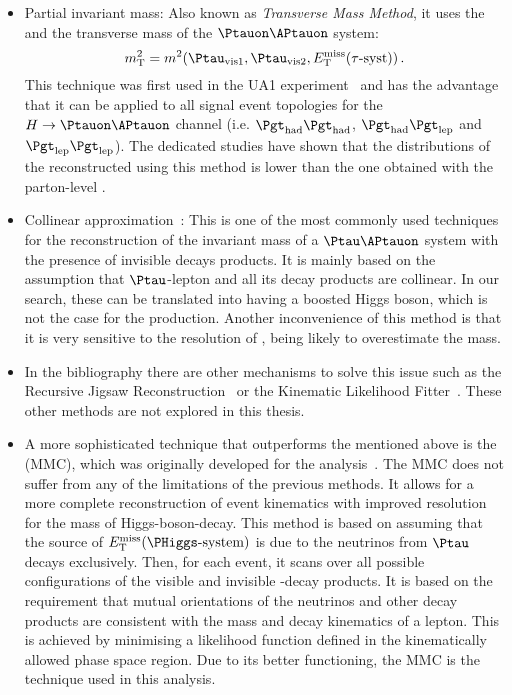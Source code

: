 \begin{itemize}
	\item Partial invariant mass: Also known as \textit{Transverse Mass Method}, it uses
		the \Hvismass and the transverse mass of the $\Ptauon\APtauon$ system:
		\begin{equation*}
			m_{\text{T}}^{2} = m^{2} (\Ptau_{\text{vis}1}, \Ptau_{\text{vis}2}, \MET(\tau\text{-syst}))\,.
		\end{equation*}
		This technique was first used in the UA1 experiment~\cite{Rubbia:155129} and has
		the advantage that it can be applied to all signal event topologies for the 
		$H \rightarrow \Ptauon \APtauon$ channel (i.e. $\tauhad \tauhad$, $\tauhad \taulep$ and $\taulep \taulep$). 
		The dedicated studies have shown that the distributions of the reconstructed \mH using this method is
		lower than the one obtained with the parton-level \mH.
		
	\item Collinear approximation~\cite{Ellis:1987xu}: This is one of the most commonly 
		used techniques for the reconstruction of the invariant mass of a $\Ptau\APtauon$ 
		system with the presence of invisible decays products.
		It is mainly based on the assumption that $\Ptau$-lepton and all its decay
		products are collinear. In our search, these can be translated into having a boosted
		Higgs boson, which is not the case for the \tHq production.
		Another inconvenience of this method is that it is very sensitive to the
		resolution of \MET, being likely to overestimate the mass. 
		
	\item In the bibliography there are other mechanisms to solve this issue such as the 
		Recursive Jigsaw Reconstruction~\cite{Jackson:2017gcy} or the 
		Kinematic Likelihood Fitter~\cite{Erdmann:2013rxa}. These other methods
		are not explored in this thesis. 
		
		


	\item A more sophisticated technique that outperforms the mentioned above is the \MMC (MMC), which was originally developed for the \Htautau 	analysis~\cite{ELAGIN2011481,ATLAS:2012gfw}. 
The MMC does not suffer from any of the limitations of the previous methods. It allows for a more complete reconstruction
of event kinematics with improved resolution for the mass of Higgs-boson-decay. 
This method is based on assuming that the source of $\MET(\PHiggs\text{-system})$ is 
due to the neutrinos from $\Ptau$ decays exclusively. Then, for each event, it scans over all possible
configurations of the visible and invisible \Ptau-decay products. 
It is based on the requirement that mutual orientations of the neutrinos and other decay products are consistent with the mass and decay kinematics of a \Ptau lepton. This is achieved by minimising a likelihood function defined in the kinematically allowed phase space region. 
Due to its better functioning, the MMC is the technique used in this analysis.
\end{itemize}
